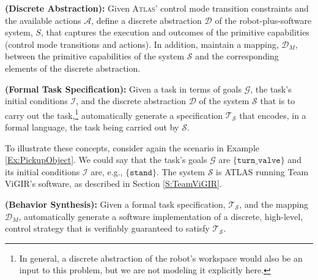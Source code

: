 
\begin{myProblem}\label{DiscreteAbstractionProblem}
\textbf{(Discrete Abstraction):}
Given \textsc{Atlas}' control mode transition constraints and the available actions $\mathcal{A}$, define a discrete abstraction $\mathcal{D}$ of the robot-plus-software system, $S$, that captures the execution and outcomes of the primitive capabilities (control mode transitions and actions).
In addition, maintain a mapping, $\mathcal{D}_M$, between the primitive capabilities of the system $\mathcal{S}$ and the corresponding elements of the discrete abstraction.
\end{myProblem}

\begin{myProblem}\label{SpecificationProblem}
\textbf{(Formal Task Specification):}
Given a task in terms of goals $\mathcal{G}$, the task's initial conditions $\mathcal{I}$, and the discrete abstraction $\mathcal{D}$ of the system $\mathcal{S}$ that is to carry out the task,\footnote{In general, a discrete abstraction of the robot's workspace would also be an input to this problem, but we are not modeling it explicitly here.}
 automatically generate a specification $\mathcal{T}_\mathcal{S}$ that encodes, in a formal language, the task being carried out by $\mathcal{S}$.
\end{myProblem}

To illustrate these concepts, consider again the scenario in Example \ref{Ex:PickupObject}. 
We could say that the task's goals $\mathcal{G}$ are $\{ \mathtt{turn\_valve} \}$ and its initial conditions $\mathcal{I}$ are, e.g., $\{ \mathtt{stand} \}$.
The system $\mathcal{S}$ is ATLAS running Team ViGIR's software, as described in Section \ref{S:TeamViGIR}.

\begin{myProblem}\label{BehaviorSynthesisProblem}
\textbf{(Behavior Synthesis):}
Given a formal task specification, $\mathcal{T}_\mathcal{S}$, and the mapping $\mathcal{D}_M$, automatically generate a software implementation of a discrete, high-level, control strategy that is verifiably guaranteed to satisfy $\mathcal{T}_\mathcal{S}$.
\end{myProblem}

